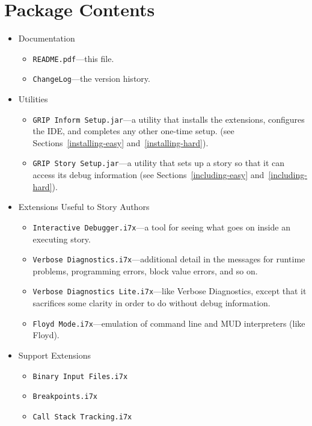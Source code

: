 \documentclass{book}
\newcommand{\lastpagebreak}{\vfill\pagebreak}
\begin{document}
\lastpagebreak

\appendix

\chapter{Package Contents}
\label{package-contents}

\begin{itemize}
  \item{Documentation}
  \begin{itemize}
    \item{\texttt{README.pdf}---this file.}
    \item{\texttt{ChangeLog}---the version history.}
  \end{itemize}
  \item{Utilities}
  \begin{itemize}
    \item{\texttt{GRIP Inform Setup.jar}---a utility that installs the extensions, configures the IDE, and completes any other one-time setup. (see Sections~\ref{installing-easy} and~\ref{installing-hard}).}
    \item{\texttt{GRIP Story Setup.jar}---a utility that sets up a story so that it can access its debug information (see Sections~\ref{including-easy} and~\ref{including-hard}).}
  \end{itemize}
  \item{Extensions Useful to Story Authors}
  \begin{itemize}
    \item{\texttt{Interactive Debugger.i7x}---a tool for seeing what goes on inside an executing story.}
    \item{\texttt{Verbose Diagnostics.i7x}---additional detail in the messages for runtime problems, programming errors, block value errors, and so on.}
    \item{\texttt{Verbose Diagnostics Lite.i7x}---like Verbose Diagnostics, except that it sacrifices some clarity in order to do without debug information.}
    \item{\texttt{Floyd Mode.i7x}---emulation of command line and MUD interpreters (like Floyd).}
  \end{itemize}
  \item{Support Extensions}
  \begin{itemize}
    \item{\texttt{Binary Input Files.i7x}}
    \item{\texttt{Breakpoints.i7x}}
    \item{\texttt{Call Stack Tracking.i7x}}

\end{itemize}
\end{itemize}
\end{document}
